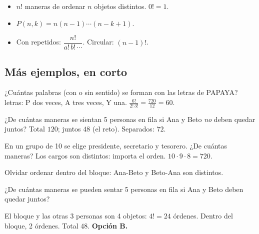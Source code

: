\begin{regla}
\begin{itemize}
  \item $n!$ maneras de ordenar $n$ objetos distintos. $0! = 1$.
  \item $P(n, k) = n(n - 1)\cdots(n - k + 1)$.
  \item Con repetidos: $\dfrac{n!}{a!\, b!\, \cdots}$. Circular: $(n - 1)!$.
\end{itemize}
\end{regla}

\subsection{Más ejemplos, en corto}
\begin{ejemplo}[Anagramas]
¿Cuántas palabras (con o sin sentido) se forman con las letras de PAPAYA?
 letras: P dos veces, A tres veces, Y una. $\tfrac{6!}{2!\,3!} = \tfrac{720}{12} = 60$.
\end{ejemplo}

\begin{ejemplo}[Separados]
¿De cuántas maneras se sientan 5 personas en fila si Ana y Beto \emph{no} deben quedar juntos?
\solucion Total $120$; juntos $48$ (el reto). Separados: $72$.
\end{ejemplo}

\begin{ejemplo}[Cargos]
En un grupo de 10 se elige presidente, secretario y tesorero. ¿De cuántas maneras?
\solucion Los cargos son distintos: importa el orden. $10 \cdot 9 \cdot 8 = 720$.
\end{ejemplo}

\begin{trampa}
Olvidar ordenar dentro del bloque: Ana-Beto y Beto-Ana son distintos.
\end{trampa}

\begin{reto}
¿De cuántas maneras se pueden sentar 5 personas en fila si Ana y Beto deben quedar juntos?
\end{reto}

\begin{retoresuelto}
El bloque  y las otras 3 personas son 4 objetos: $4! = 24$ órdenes. Dentro del bloque, 2 órdenes. Total
$48$. \textbf{Opción B.}
\end{retoresuelto}

